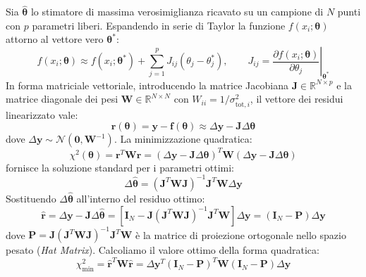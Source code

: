 \documentclass[11pt,a4paper]{article}
\begin{document}
Sia $\hat{\boldsymbol{\theta}}$ lo stimatore di massima verosimiglianza ricavato su un campione di $N$ punti con $p$ parametri liberi. Espandendo in serie di Taylor la funzione $f(x_i; \boldsymbol{\theta})$ attorno al vettore vero $\boldsymbol{\theta}^*$:
\begin{equation}
    f(x_i; \boldsymbol{\theta}) \approx f(x_i; \boldsymbol{\theta}^*) + \sum_{j=1}^p J_{ij} (\theta_j - \theta_j^*), \qquad J_{ij} = \left.\frac{\partial f(x_i; \boldsymbol{\theta})}{\partial \theta_j}\right|_{\boldsymbol{\theta}^*}
\end{equation}
In forma matriciale vettoriale, introducendo la matrice Jacobiana $\mathbf{J} \in \mathbb{R}^{N \times p}$ e la matrice diagonale dei pesi $\mathbf{W} \in \mathbb{R}^{N \times N}$ con $W_{ii} = 1/\sigma_{\text{tot}, i}^2$, il vettore dei residui linearizzato vale:
\begin{equation}
    \mathbf{r}(\boldsymbol{\theta}) = \mathbf{y} - \mathbf{f}(\boldsymbol{\theta}) \approx \Delta \mathbf{y} - \mathbf{J} \Delta \boldsymbol{\theta}
\end{equation}
dove $\Delta \mathbf{y} \sim \mathcal{N}(\mathbf{0}, \mathbf{W}^{-1})$. La minimizzazione quadratica:
\begin{equation}
    \chi^2(\boldsymbol{\theta}) = \mathbf{r}^T \mathbf{W} \mathbf{r} = (\Delta \mathbf{y} - \mathbf{J} \Delta \boldsymbol{\theta})^T \mathbf{W} (\Delta \mathbf{y} - \mathbf{J} \Delta \boldsymbol{\theta})
\end{equation}
fornisce la soluzione standard per i parametri ottimi:
\begin{equation}
    \Delta \hat{\boldsymbol{\theta}} = (\mathbf{J}^T \mathbf{W} \mathbf{J})^{-1} \mathbf{J}^T \mathbf{W} \Delta \mathbf{y}
\end{equation}
Sostituendo $\Delta \hat{\boldsymbol{\theta}}$ all'interno del residuo ottimo:
\begin{equation}
    \hat{\mathbf{r}} = \Delta \mathbf{y} - \mathbf{J} \Delta \hat{\boldsymbol{\theta}} = \left[ \mathbf{I}_N - \mathbf{J} (\mathbf{J}^T \mathbf{W} \mathbf{J})^{-1} \mathbf{J}^T \mathbf{W} \right] \Delta \mathbf{y} = (\mathbf{I}_N - \mathbf{P}) \Delta \mathbf{y}
\end{equation}
dove $\mathbf{P} = \mathbf{J} (\mathbf{J}^T \mathbf{W} \mathbf{J})^{-1} \mathbf{J}^T \mathbf{W}$ è la matrice di proiezione ortogonale nello spazio pesato (\emph{Hat Matrix}). Calcoliamo il valore ottimo della forma quadratica:
\begin{equation}
    \chi^2_{\text{min}} = \hat{\mathbf{r}}^T \mathbf{W} \hat{\mathbf{r}} = \Delta \mathbf{y}^T (\mathbf{I}_N - \mathbf{P})^T \mathbf{W} (\mathbf{I}_N - \mathbf{P}) \Delta \mathbf{y}
\end{equation}
\end{document}
